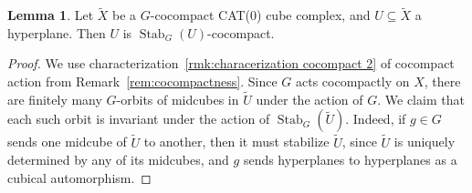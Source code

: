 \documentclass[12pt,oneside]{amsart}
\theoremstyle{definition}
\newtheorem{lem}[thm]{Lemma}
\theoremstyle{definition}
\theoremstyle{remark}
\DeclareMathOperator{\Stab}{Stab}
\begin{document}
\begin{lem}\label{lem: stab-cocompactness}
Let $\widetilde X$ be a $G$-cocompact CAT(0) cube complex, and $ U\subseteq \widetilde X$ a hyperplane. Then $U$ is $\Stab_G(U)$-cocompact. 
\end{lem}

\begin{proof}
    We use characterization~\eqref{rmk:characerization cocompact 2} of cocompact action from Remark~\ref{rem:cocompactness}.
    Since $G$ acts cocompactly on $X$, there are finitely many $G$-orbits of midcubes in $\widetilde U$ under the action of $G$. We claim that each such orbit is invariant under the action of $\Stab_G(\widetilde U)$. Indeed, if $g\in G$ sends one midcube of $\widetilde U$ to another, then it must stabilize $\widetilde U$, since $\widetilde U$ is uniquely determined by any of its midcubes, and $g$ sends hyperplanes to hyperplanes as a cubical automorphism.
\end{proof}
\end{document}
